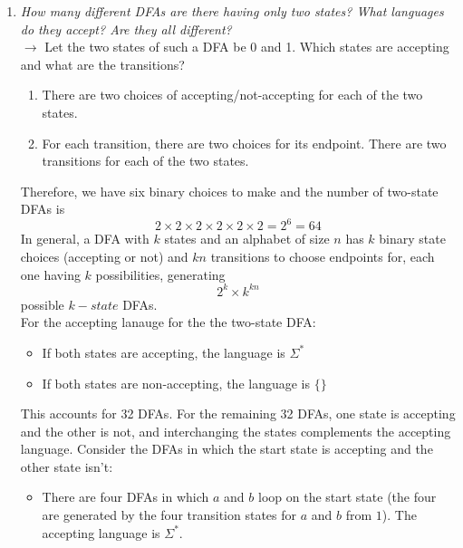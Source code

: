 \documentclass[11pt]{article}
\begin{document}
\begin{enumerate}
  \item \textit{How many different DFAs are there having only two states? What languages do they accept? Are they all different?} \\
  $\to$ Let the two states of such a DFA be 0 and 1. Which states are accepting and what are the transitions?
  \begin{enumerate}
    \item There are two choices of accepting/not-accepting for each of the two states.
    \item For each transition, there are two choices for its endpoint. There are two transitions for each of the two states.
  \end{enumerate}
  Therefore, we have six binary choices to make and the number of two-state DFAs is 
  $$
  2 \times 2 \times 2 \times 2 \times 2 \times 2 = 2^6 = 64
  $$
  In general, a DFA with $k$ states and an alphabet of size $n$ has $k$ binary state choices (accepting or not) and $kn$ transitions to choose endpoints for, each one having $k$ possibilities, generating
  $$
   2^k \times k^{kn}
  $$
  possible $k-state$ DFAs.\\
  For the accepting lanauge for the the two-state DFA:
  \begin{itemize}
    \item If both states are accepting, the language is $\Sigma ^*$
    \item If both states are non-accepting, the language is $\{\}$
  \end{itemize}
  This accounts for 32 DFAs. For the remaining 32 DFAs, one state is accepting and the other is not, and interchanging the states complements the accepting language.
  Consider the DFAs in which the start state is accepting and the other state isn't:
  \begin{center}
  \end{center}
  \begin{itemize}
    \item There are four DFAs in which $a$ and $b$ loop on the start state (the four are generated by the four transition states for $a$ and $b$ from $1$). The accepting language is $\Sigma^*$.
      \begin{center}
\end{center}
\end{itemize}
\end{enumerate}
\end{document}
